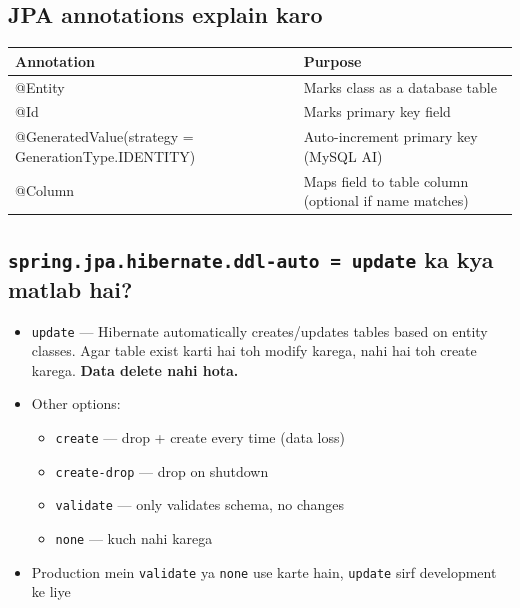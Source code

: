 \documentclass[12pt,a4paper]{article}
\begin{document}
\subsection{JPA annotations explain karo}

\begin{answerbox}
\begin{center}
\begin{tabular}{>{\ttfamily}l p{9cm}}
\toprule
\textbf{Annotation} & \textbf{Purpose} \\
\midrule
@Entity & Marks class as a database table \\
@Id & Marks primary key field \\
@GeneratedValue(strategy = GenerationType.IDENTITY) & Auto-increment primary key (MySQL AI) \\
@Column & Maps field to table column (optional if name matches) \\
\bottomrule
\end{tabular}
\end{center}
\end{answerbox}

\subsection{\texttt{spring.jpa.hibernate.ddl-auto = update} ka kya matlab hai?}

\begin{answerbox}
\begin{itemize}
    \item \texttt{update} --- Hibernate automatically creates/updates tables based on entity classes. Agar table exist karti hai toh modify karega, nahi hai toh create karega. \textbf{Data delete nahi hota.}
    \item Other options:
    \begin{itemize}
        \item \texttt{create} --- drop + create every time (data loss)
        \item \texttt{create-drop} --- drop on shutdown
        \item \texttt{validate} --- only validates schema, no changes
        \item \texttt{none} --- kuch nahi karega
    \end{itemize}
    \item Production mein \texttt{validate} ya \texttt{none} use karte hain, \texttt{update} sirf development ke liye
\end{itemize}
\end{answerbox}
\end{document}
